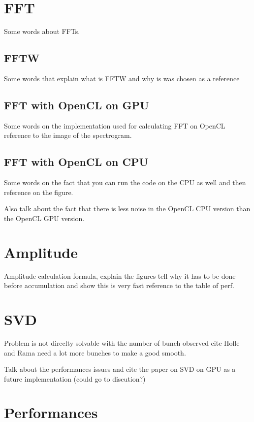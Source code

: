 \section{FFT}

Some words about FFTs.

   \subsection{FFTW}

   Some words that explain what is FFTW and why is was chosen as a reference

   \subsection{FFT with OpenCL on GPU}

   Some words on the implementation used for calculating FFT on OpenCL reference to the image of the spectrogram.

   \subsection{FFT with OpenCL on CPU}

   Some words on the fact that you can run the code on the CPU as well and then reference on the figure.

   Also talk about the fact that there is less noise in the OpenCL CPU version than the OpenCL GPU version.

\section{Amplitude}

Amplitude calculation formula, explain the figures tell why it has to be done before accumulation and show this is very fast reference to the table of perf.

\section{SVD}

Problem is not direclty solvable with the number of bunch observed cite Hofle and Rama need a lot more bunches to make a good smooth\cite{calaga06}. 

Talk about the performances issues and cite the paper on SVD on GPU as a future implementation (could go to discution?)\cite{Lahabar09}

\section{Performances}

